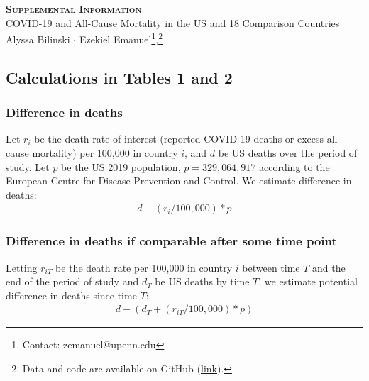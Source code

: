 \documentclass[
]{article}
\author{}
\date{\vspace{-2.5em}}
\begin{document}
\begin{center} 
    \textbf{\scshape \LARGE Supplemental Information}\\  \vspace{2mm}
    {\large COVID-19 and All-Cause Mortality in the US and 18 Comparison Countries}\\ \vspace{2mm} 
    {\large Alyssa Bilinski $\cdot$ Ezekiel Emanuel\footnote{Contact: zemanuel@upenn.edu},\footnote{Data and code are available on GitHub (\href{https://github.com/abilinski/MortalityCOVID19}{link}).}} \\
\end{center}

\vspace{-0.50em}

\bigskip

\hypertarget{calculations-in-tables-1-and-2}{%
\subsection{Calculations in Tables 1 and
2}\label{calculations-in-tables-1-and-2}}

\hypertarget{difference-in-deaths}{%
\subsubsection{Difference in deaths}\label{difference-in-deaths}}

Let \(r_i\) be the death rate of interest (reported COVID-19 deaths or
excess all cause mortality) per 100,000 in country \(i\), and \(d\) be
US deaths over the period of study. Let \(p\) be the US 2019 population,
\(p=329,064,917\) according to the European Centre for Disease
Prevention and Control. We estimate difference in deaths: \begin{align}
d - \left(r_i/100,000\right)*p
\end{align}

\hypertarget{difference-in-deaths-if-comparable-after-some-time-point}{%
\subsubsection{Difference in deaths if comparable after some time
point}\label{difference-in-deaths-if-comparable-after-some-time-point}}

Letting \(r_{iT}\) be the death rate per 100,000 in country \(i\)
between time \(T\) and the end of the period of study and \(d_T\) be US
deaths by time \(T\), we estimate potential difference in deaths since
time \(T\): \begin{align}
d - \left(d_T + \left(r_{iT}/100,000\right)*p\right)
\end{align}
\end{document}
